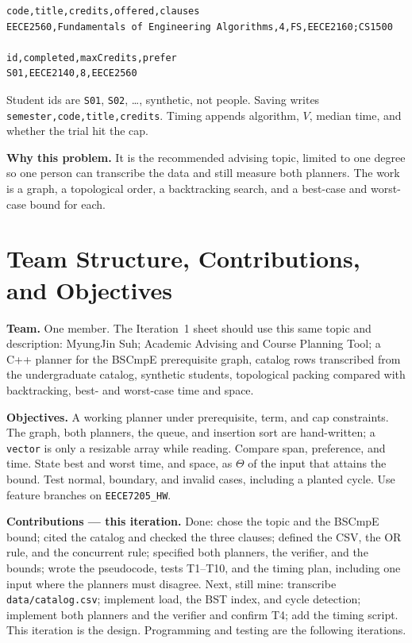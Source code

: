 \documentclass[10pt]{article}
\begin{document}
\begin{lstlisting}[style=term]
code,title,credits,offered,clauses
EECE2560,Fundamentals of Engineering Algorithms,4,FS,EECE2160;CS1500

id,completed,maxCredits,prefer
S01,EECE2140,8,EECE2560
\end{lstlisting}

Student ids are \texttt{S01}, \texttt{S02}, \ldots, synthetic, not people.
Saving writes \texttt{semester,code,title,credits}. Timing appends algorithm,
\(V\), median time, and whether the trial hit the cap.

\textbf{Why this problem.} It is the recommended advising topic, limited to one
degree so one person can transcribe the data and still measure both planners.
The work is a graph, a topological order, a backtracking search, and a
best-case and worst-case bound for each.

\section{Team Structure, Contributions, and Objectives}

\textbf{Team.} One member. The Iteration~1 sheet should use this same topic
and description: MyungJin Suh; Academic Advising and Course Planning Tool; a
C++ planner for the BSCmpE prerequisite graph, catalog rows transcribed from
the undergraduate catalog, synthetic students, topological packing compared
with backtracking, best- and worst-case time and space.

\textbf{Objectives.} A working planner under prerequisite, term, and cap
constraints. The graph, both planners, the queue, and insertion sort are
hand-written; a \texttt{vector} is only a resizable array while reading.
Compare span, preference, and time. State best and worst time, and space, as
\(\Theta\) of the input that attains the bound. Test normal, boundary, and
invalid cases, including a planted cycle. Use feature branches on
\texttt{EECE7205\_HW}.

\textbf{Contributions --- this iteration.} Done: chose the topic and the
BSCmpE bound; cited the catalog and checked the three clauses; defined the CSV,
the OR rule, and the concurrent rule; specified both planners, the verifier,
and the bounds; wrote the pseudocode, tests T1--T10, and the timing plan,
including one input where the planners must disagree. Next, still mine:
transcribe \texttt{data/catalog.csv}; implement load, the BST index, and cycle
detection; implement both planners and the verifier and confirm T4; add the
timing script. This iteration is the design. Programming and testing are the
following iterations.
\end{document}
